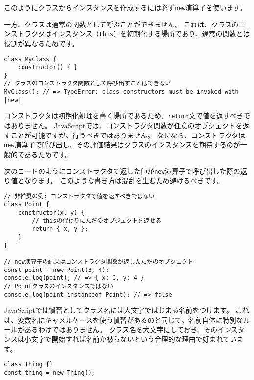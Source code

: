このようにクラスからインスタンスを作成するには必ず\texttt{new}演算子を使います。

一方、クラスは通常の関数として呼ぶことができません。
これは、クラスのコンストラクタはインスタンス（\texttt{this}）を初期化する場所であり、通常の関数とは役割が異なるためです。

\begin{lstlisting}
class MyClass {
    constructor() { }
}
// クラスのコンストラクタ関数として呼び出すことはできない
MyClass(); // => TypeError: class constructors must be invoked with |new|
\end{lstlisting}

コンストラクタは初期化処理を書く場所であるため、\texttt{return}文で値を返すべきではありません。
JavaScriptでは、コンストラクタ関数が任意のオブジェクトを返すことが可能ですが、行うべきではありません。
なぜなら、コンストラクタは\texttt{new}演算子で呼び出し、その評価結果はクラスのインスタンスを期待するのが一般的であるためです。

次のコードのようにコンストラクタで返した値が\texttt{new}演算子で呼び出した際の返り値となります。
このような書き方は混乱を生むため避けるべきです。

\begin{lstlisting}
// 非推奨の例: コンストラクタで値を返すべきではない
class Point {
    constructor(x, y) {
        // thisの代わりにただのオブジェクトを返せる
        return { x, y };
    }
}

// new演算子の結果はコンストラクタ関数が返したただのオブジェクト
const point = new Point(3, 4);
console.log(point); // => { x: 3, y: 4 }
// Pointクラスのインスタンスではない
console.log(point instanceof Point); // => false
\end{lstlisting}

\begin{note}{}
\hypertarget{class-name-start-upper-case}{%
\underline{}\label{class-name-start-upper-case}}

JavaScriptでは慣習としてクラス名には大文字ではじまる名前をつけます。
これは、変数名にキャメルケースを使う慣習があるのと同じで、名前自体に特別なルールがあるわけではありません。
クラス名を大文字にしておき、そのインスタンスは小文字で開始すれば名前が被らないという合理的な理由で好まれています。

\begin{lstlisting}
class Thing {}
const thing = new Thing();
\end{lstlisting}
\end{note}

